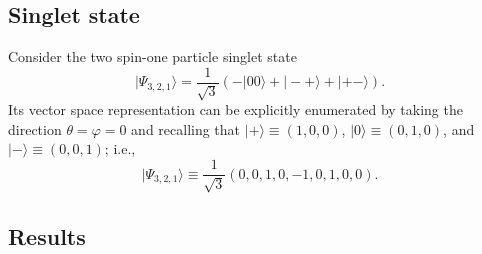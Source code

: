 \documentclass[pra,amsfonts,showpacs,showkeys,preprint]{revtex4}
\begin{document}
\subsection{Singlet state}

Consider the two spin-one particle singlet state
\begin{equation}
\label{2009-gtq-s1}
\vert \Psi_{3,2,1} \rangle  =  \frac{1}{\sqrt{3}}\left(-|00\rangle + |-+\rangle + |+-\rangle \right)
.
\end{equation}
Its vector space representation can be explicitly enumerated by taking the direction $\theta =\varphi =0$ and recalling that
$\vert +\rangle \equiv (1,0,0)$,
$\vert 0\rangle \equiv (0,1,0)$, and
$\vert -\rangle \equiv (0,0,1)$; i.e.,
\begin{equation}
\label{2009-gtq-s1ef}
\vert \Psi_{3,2,1} \rangle  \equiv  \frac{1}{\sqrt{3}}\left(0,0,1,0,-1,0,1,0,0 \right)
.
\end{equation}

\subsection{Results}
\end{document}
